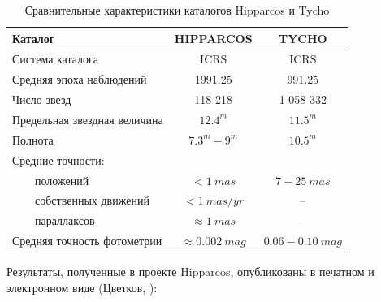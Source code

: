\documentclass[14pt]{article} %
\begin{document}
\begin{table}[h!]
\centering
\caption{Сравнительные характеристики каталогов
Hipparcos и Tycho}
\label{tabular:hip_tycho}
\begin{tabular}{|l|c|c|}
\hline 	
Каталог & HIPPARCOS & TYCHO\\
\hline
Система каталога & ICRS & ICRS\\
\hline 	
Средняя эпоха наблюдений & 1991.25 & 991.25\\
\hline 	
Число звезд & 118 218 & 1 058 332\\
\hline 	
Предельная звездная величина & $12.4^m$ & $11.5^m$\\
\hline 	
Полнота & $7.3^m - 9^m$ & $10.5^m$\\
\hline 	
Средние точности: & &\\
\hline 	
$\qquad$положений & $< 1~mas$ & $7-25~mas$\\
\hline 	
$\qquad$собственных движений & $< 1~mas/yr$ & --\\
\hline 	
$\qquad$параллаксов & $\approx 1~mas$ & --\\
\hline 	
Средняя точность фотометрии & $\approx 0.002~mag$ & $0.06 - 0.10~mag$\\
\hline 
\end{tabular}
\end{table}

Результаты, полученные в проекте Hipparcos, опубликованы в печатном и электронном виде (Цветков, \cite{book:hipparcos}):
\end{document}
